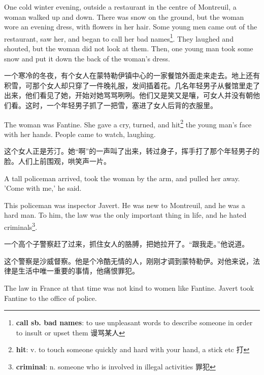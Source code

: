 \documentclass[fontset=ubuntu, zihao=5]{ctexart}
\begin{document}
\begin{paracol}{2}
  \switchcolumn*

  One cold winter evening, outside a restaurant in the centre of Montreuil, a
  woman walked up and down. There was snow on the ground, but the woman wore
  an evening dress, with flowers in her hair. Some young men came out of the
  restaurant, saw her, and began to call her bad names\footnote{\textbf{call
      sb. bad names}: to use unpleasant words to describe someone in order to
    insult or upset them 谩骂某人}. They laughed and shouted, but the woman
  did not look at them. Then, one young man took some snow and put it down the
  back of the woman's dress.

  \switchcolumn

  一个寒冷的冬夜，有个女人在蒙特勒伊镇中心的一家餐馆外面走来走去。地上还有积雪，可那个女人却只穿了一件晚礼服，发间插着花。几名年轻男子从餐馆里走了出来，他们看见了她，开始对她骂骂咧咧。他们又是笑又是嚷，可女人并没有朝他们看。这时，一个年轻男子抓了一把雪，塞进了女人后背的衣服里。

  \switchcolumn*

  The woman was Fantine. She gave a cry, turned, and
  hit\footnote{\textbf{hit}: v. to touch someone quickly and hard with your
    hand, a stick etc 打} the young man's face with her hands. People came to
  watch, laughing.

  \switchcolumn

  这个女人正是芳汀。她“啊”的一声叫了出来，转过身子，挥手打了那个年轻男子的脸。人们上前围观，哄笑声一片。

  \switchcolumn*

  A tall policeman arrived, took the woman by the arm, and pulled her away. 'Come with me,' he said.


  This policeman was inspector Javert. He was new to Montreuil, and he was a hard man. To him, the law was the only important thing in life, and he hated criminals\footnote{\textbf{criminal}: n. someone who is involved in illegal activities 罪犯}.

  \switchcolumn

  一个高个子警察赶了过来，抓住女人的胳膊，把她拉开了。“跟我走。”他说道。


  这个警察是沙威督察。他是个冷酷无情的人，刚刚才调到蒙特勒伊。对他来说，法律是生活中唯一重要的事情，他痛恨罪犯。

  \switchcolumn*

  The law in France at that time was not kind to women like Fantine. Javert took Fantine to the office of police.


\end{paracol}
\end{document}
